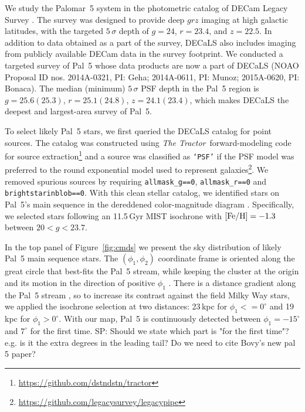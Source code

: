 \documentclass[twocolumn]{aastex62}
\newcommand{\tractor}{\textsl{The Tractor}}
\newcommand{\sa}[1]{{\color{magenta} SP: #1}}
\begin{document}
We study the Palomar~5 system in the photometric catalog of DECam Legacy Survey \citep[DECaLS, part of the DESI Legacy Imaging Surveys,][]{dey2019}.
The survey was designed to provide deep $grz$ imaging at high galactic latitudes, with the targeted $5\,\sigma$ depth of $g=24$, $r=23.4$, and $z=22.5$.
In addition to data obtained as a part of the survey, DECaLS also includes imaging from publicly available DECam data in the survey footprint.
We conducted a targeted survey of Pal~5 whose data products are now a part of DECaLS (NOAO Proposal ID nos. 2014A-0321, PI: Geha; 2014A-0611, PI: Munoz; 2015A-0620, PI: Bonaca).
The median (minimum) $5\,\sigma$ PSF depth in the Pal~5 region is $g=25.6(25.3)$, $r=25.1(24.8)$, $z=24.1(23.4)$, which makes DECaLS the deepest and largest-area survey of Pal~5.

To select likely Pal~5 stars, we first queried the DECaLS catalog for point sources.
The catalog was constructed using \tractor\ forward-modeling code for source extraction\footnote{\url{https://github.com/dstndstn/tractor}} and a source was classified as \texttt{`PSF'} if the PSF model was preferred to the round exponential model used to represent galaxies\footnote{\url{https://github.com/legacysurvey/legacypipe}}.
We removed spurious sources by requiring \texttt{allmask\_g==0}, \texttt{allmask\_r==0} and \texttt{brightstarinblob==0}.
With this clean stellar catalog, we identified stars on Pal~5's main sequence in the dereddened color-magnitude diagram \citep{Schlegel:1998}.
Specifically, we selected stars following an 11.5\,Gyr MIST isochrone with $\rm [Fe/H] = -1.3$ \citep{Choi:2016} between $20<g<23.7$.

In the top panel of Figure~\ref{fig:cmds} we present the sky distribution of likely Pal~5 main sequence stars.
The $(\phi_1,\phi_2)$ coordinate frame is oriented along the great circle that best-fits the Pal~5 stream, while keeping the cluster at the origin and its motion in the direction of positive $\phi_1$ \citep{gala}.
There is a distance gradient along the Pal~5 stream \citep{Ibata:2016}, so to increase its contrast against the field Milky Way stars, we applied the isochrone selection at two distances: 23\,kpc for $\phi_1<=0^\circ$ and 19\,kpc for $\phi_1>0^\circ$.
With our map, Pal~5 is continuously detected between $\phi_1=-15^\circ$ and $7^\circ$ for the first time. \sa{Should we state which part is "for the first time"? e.g. is it the extra degrees in the leading tail? Do we need to cite Bovy's new pal 5 paper?}
\end{document}
